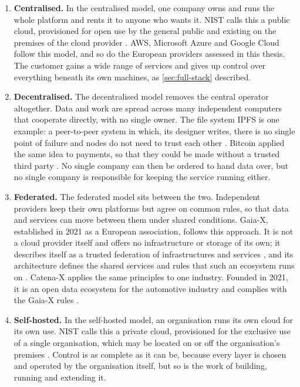 \begin{enumerate}
  \item \textbf{Centralised.} In the centralised model, one company owns and runs the whole platform and
rents it to anyone who wants it. \acs{NIST} calls this a public cloud, provisioned for
open use by the general public and existing on the premises of the cloud provider
\cite{NIST_SP800145_2011}. \acs{AWS}, Microsoft Azure and Google Cloud follow this
model, and so do the European providers assessed in this thesis. The customer
gains a wide range of services and gives up control over everything beneath its
own machines, as \cref{sec:full-stack} described.

  \item \textbf{Decentralised.} The decentralised model removes the central operator altogether. Data and
work are spread across many independent computers that cooperate directly, with
no single owner. The file system IPFS is one example: a peer-to-peer system in
which, its designer writes, there is no single point of failure and nodes do not
need to trust each other \cite{Benet_IPFS_2014}. Bitcoin applied the same idea to
payments, so that they could be made without a trusted third party
\cite{Nakamoto_Bitcoin_2008}. No single company can then be ordered to hand data
over, but no single company is responsible for keeping the service running
either.

  \item \textbf{Federated.} The federated model sits between the two. Independent providers keep their
own platforms but agree on common rules, so that data and services can move
between them under shared conditions. Gaia-X, established in 2021 as a
European association, follows this approach. It is not a cloud provider itself and
offers no infrastructure or storage of its own; it describes itself as a trusted
federation of infrastructures and services \cite{GaiaX_FAQ}, and its architecture
defines the shared services and rules that such an ecosystem runs on
\cite{GAIAX_Architecture_2023}. Catena-X applies the same principles to one
industry. Founded in 2021, it is an open data ecosystem for the automotive
industry and complies with the Gaia-X rules \cite{CatenaX_Network_2026}.

  \item \textbf{Self-hosted.} In the self-hosted model, an organisation runs its own cloud for its own
use. \acs{NIST} calls this a private cloud, provisioned for the exclusive use of a single
organisation, which may be located on or off the organisation's premises
\cite{NIST_SP800145_2011}. Control is as complete as it can be, because every layer
is chosen and operated by the organisation itself, but so is the work of building,
running and extending it.
\end{enumerate}

